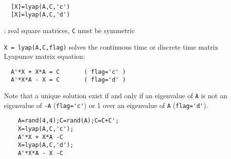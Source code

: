 \begin{mandesc}
   \\ %
\end{mandesc}
\begin{calling_sequence}
\begin{verbatim}
  [X]=lyap(A,C,'c')  
  [X]=lyap(A,C,'d')  
\end{verbatim}
\end{calling_sequence}
\begin{parameters}
  \begin{varlist}
    : real square matrices, \verb!C! must be symmetric
  \end{varlist}
\end{parameters}
\begin{mandescription}
  \verb!X = lyap(A,C,flag)! solves the continuous time or
  discrete time matrix Lyapunov matrix equation:
\begin{verbatim}
  A'*X + X*A = C       ( flag='c' )
  A'*X*A - X = C       ( flag='d' )
\end{verbatim}
Note that a unique solution exist if and only if an eigenvalue of \verb!A! is
not an eigenvalue of \verb!-A! (\verb!flag='c'!)  or 1 over an eigenvalue of \verb!A! 
(\verb!flag='d'!).
\end{mandescription}
\begin{examples}
  \begin{Verbatim}
    A=rand(4,4);C=rand(A);C=C+C';
    X=lyap(A,C,'c');
    A'*X + X*A -C
    X=lyap(A,C,'d');
    A'*X*A - X -C
  \end{Verbatim}
\end{examples}
\begin{manseealso}
      
\end{manseealso}
